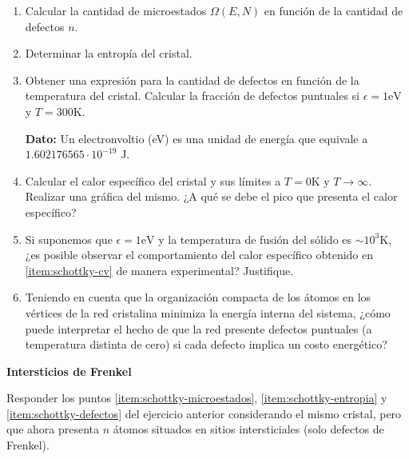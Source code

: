 \documentclass[a4paper,11pt]{article}
\begin{document}
\begin{enumerate}[label=(\alph*),
                  leftmargin=2\parindent,
                  rightmargin=2\parindent]

    \item{\label{item:schottky-microestados}
          Calcular la cantidad de microestados $\Omega(E, N)$ en 
          función de la cantidad de defectos $n$.
          }

    \item{\label{item:schottky-entropia}
          Determinar la entropía del cristal.}
    
    \item{\label{item:schottky-defectos}
          Obtener una expresión para la cantidad de defectos en 
          función de la temperatura del cristal.
          Calcular la fracción de defectos puntuales si
          $\epsilon = 1 \text{eV}$ y $T = 300 \text{K}$.
          }

    {\small
    \textbf{Dato:}
    Un electronvoltio (eV) es una unidad de energía que equivale a 
    $1.602176565 \cdot 10^{-19}$ J.
    }
    
    \item{\label{item:schottky-cv}
          Calcular el calor específico del cristal y sus límites
          a $T = 0 \text{K}$ y $T \rightarrow \infty$.
          Realizar una gráfica del mismo.
          ¿A qué se debe el pico que presenta el calor específico?
          }

    \item{Si suponemos que $\epsilon = 1 \text{eV}$ y la temperatura de fusión 
          del sólido es $\sim 10^3 \text{K}$, ¿es posible observar 
          el comportamiento del calor específico obtenido en 
          \ref{item:schottky-cv} de manera experimental? Justifique.
          }
    
    \item{Teniendo en cuenta que la organización compacta de los átomos 
          en los vértices de la red cristalina minimiza la energía 
          interna del sistema, ¿cómo puede interpretar el hecho de que 
          la red presente defectos puntuales (a temperatura distinta de 
          cero) si cada defecto implica un costo energético?
          }

\end{enumerate}


\textbf{Intersticios de Frenkel}
\vspace{0.5em}

Responder los puntos \ref{item:schottky-microestados}, 
\ref{item:schottky-entropia} y \ref{item:schottky-defectos} del 
ejercicio anterior considerando el mismo cristal, pero que ahora 
presenta $n$ átomos situados en sitios intersticiales (solo defectos de 
Frenkel).
\end{document}
